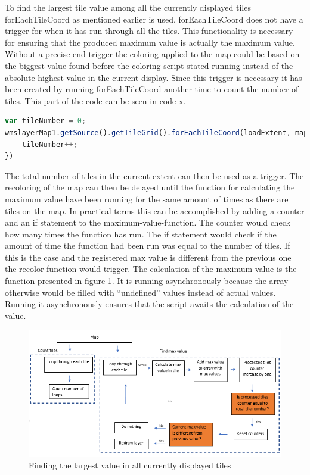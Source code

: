 To find the largest tile value among all the currently displayed tiles forEachTileCoord as mentioned earlier is used. forEachTileCoord does not have a trigger for when it has run through all the tiles. This functionality is necessary for ensuring that the produced maximum value is actually the maximum value. Without a precise end trigger the coloring applied to the map could be based on the biggest value found before the coloring script stated running instead of the absolute highest value in the current display.
Since this trigger is necessary it has been created by running forEachTileCoord another time to count the number of tiles. This part of the code can be seen in code x.
\begin{lstlisting}[language=JavaScript, caption={The JavaScript in the project}, label= VoresJS,escapechar=|] 
var tileNumber = 0;
wmslayerMap1.getSource().getTileGrid().forEachTileCoord(loadExtent, mapZoom - zoomlevelAdjustment, function(tileCoord) {
	tileNumber++;
})
\end{lstlisting}
The total number of tiles in the current extent can then be used as a trigger. 
The recoloring of the map can then be delayed until the function for calculating the maximum value have been running for the same amount of times as there are tiles on the map. In practical terms this can be accomplished by adding a counter and an if statement to the maximum-value-function. The counter would check how many times the function has run. The if statement would check if the amount of time the function had been run was equal to the number of tiles. If this is the case and the registered max value is different from the previous one the recolor function would trigger.
The calculation of the maximum value is the function presented in figure \ref{DoubleLoop}. It is running asynchronously because the array otherwise would be filled with “undefined” values instead of actual values. Running it asynchronously ensures that the script awaits the calculation of the value.  
\begin{figure} [H]
	\centering
	\includegraphics[width=.8\textwidth]{Pictures/DoubleLoop}
	\caption{Finding the largest value in all currently displayed tiles}
	\label{DoubleLoop}
\end{figure}

